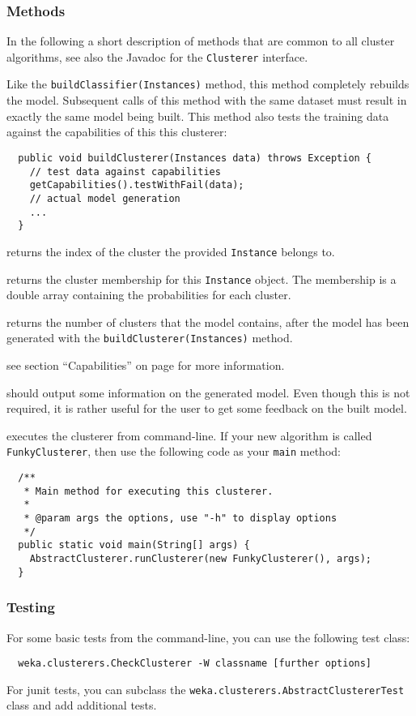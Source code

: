 \subsubsection*{Methods}
In the following a short description of methods that are common to all cluster
algorithms, see also the Javadoc for the \texttt{Clusterer} interface.

Like the \texttt{buildClassifier(Instances)} method, this method completely
rebuilds the model. Subsequent calls of this method with the same dataset must
result in exactly the same model being built. This method also tests the
training data against the capabilities of this this clusterer:
\begin{verbatim}
  public void buildClusterer(Instances data) throws Exception {
    // test data against capabilities
    getCapabilities().testWithFail(data);
    // actual model generation
    ...
  }
\end{verbatim}

returns the index of the cluster the provided \texttt{Instance} belongs to.

returns the cluster membership for this \texttt{Instance} object. The
membership is a double array containing the probabilities for each cluster.

returns the number of clusters that the model contains, after the model has
been generated with the \texttt{buildClusterer(Instances)} method.

see section ``Capabilities'' on page \pageref{classifier_capabilities} for more
information.

should output some information on the generated model. Even though this is not
required, it is rather useful for the user to get some feedback on the built
model.

executes the clusterer from command-line. If your new algorithm is called
\texttt{FunkyClusterer}, then use the following code as your \texttt{main}
method:
\begin{verbatim}
  /**
   * Main method for executing this clusterer.
   *
   * @param args the options, use "-h" to display options
   */
  public static void main(String[] args) {
    AbstractClusterer.runClusterer(new FunkyClusterer(), args);
  }
\end{verbatim}

\subsubsection*{Testing}
For some basic tests from the command-line, you can use the following test
class:
\begin{verbatim}
  weka.clusterers.CheckClusterer -W classname [further options]
\end{verbatim}
For junit tests, you can subclass the
\texttt{weka.clusterers.AbstractClustererTest} class and add additional tests.

